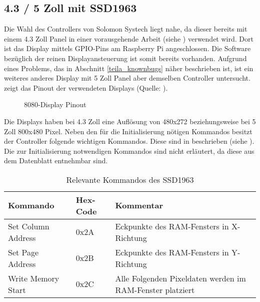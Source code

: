 \subsection{4.3 / 5 Zoll mit SSD1963}
Die Wahl des Controllers  von Solomon Systech liegt nahe, da dieser bereits mit einem 4.3 Zoll  Panel in einer vorausgehende Arbeit (siehe \cite{Schlegel2013a}) verwendet wird. Dort ist das Display mittels GPIO-Pins am Raspberry Pi angeschlossen. Die Software bezüglich der reinen Displayansteuerung ist somit bereits vorhanden. Aufgrund eines Problems, das in Abschnitt \ref{teila_knownbugs} näher beschrieben ist, ist ein weiteres anderes Display mit 5 Zoll Panel aber demselben Controller untersucht. 
 zeigt das Pinout der verwendeten Displays (Quelle: \cite{Coldtears2014}).
\begin{figure}[h]
	\centering
{}
	\caption{8080-Display Pinout}
	\label{fig:8080_pinout}
\end{figure}
Die Displays haben bei 4.3 Zoll eine Auflösung von 480x272 beziehungsweise bei 5 Zoll 800x480 Pixel. Neben den für die Initialisierung nötigen Kommandos besitzt der Controller folgende wichtigen Kommandos. Diese sind in  beschrieben (siehe \cite{SSD2008}). Die zur Initialisierung notwendigen Kommandos sind nicht erläutert, da diese aus dem Datenblatt entnehmbar sind.
\begin{table}[h]
\begin{tabular}{|p{4cm}|p{1cm}|p{8cm}|}\hline
\rowcolor{TableBackgroundColor} 
   \textbf{Kommando} & \textbf{Hex-Code} & \textbf{Kommentar}\\ \hline
   Set Column Address & 0x2A & Eckpunkte des RAM-Fensters in X-Richtung \\ \hline
   Set Page Address & 0x2B & Eckpunkte des RAM-Fensters in Y-Richtung \\ \hline
   Write Memory Start & 0x2C & Alle Folgenden Pixeldaten werden im RAM-Fenster platziert \\ \hline
\end{tabular}
\caption{Relevante Kommandos des SSD1963}
\label{tab:Kommandos_SSD1963}
\end{table}
